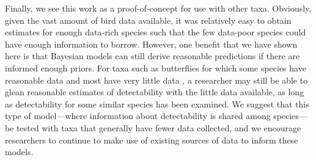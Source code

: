 \par Finally, we see this work as a proof-of-concept for use with other taxa.
Obviously, given the vast amount of bird data available, it was relatively easy to obtain estimates for enough data-rich species such that the few data-poor species could have enough information to borrow. 
However, one benefit that we have shown here is that Bayesian models can still derive reasonable predictions if there are informed enough priors.
For taxa such as butterflies for which some species have reasonable data and most have very little data \citep{lewthwaite_geographical_2022}, a researcher may still be able to glean reasonable estimates of detectability with the little data available, as long as detectability for some similar species has been examined.
We suggest that this type of model---where information about detectability is shared among species---be tested with taxa that generally have fewer data collected, and we encourage researchers to continue to make use of existing sources of data \citep{binley_minimizing_2023} to inform these models.


